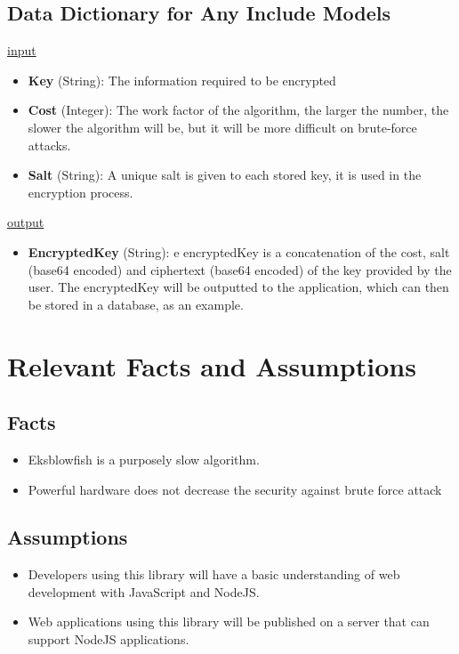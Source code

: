 \documentclass[12pt]{article}
\begin{document}
\subsection{Data Dictionary for Any Include Models}
	\underline{input} 
	\begin{itemize}
		\item \textbf{Key} (String): The information required to be encrypted
		\item \textbf{Cost} (Integer): The work factor of the algorithm, the larger the number, the slower the algorithm will be, but it will be more difficult on brute-force attacks.
		\item \textbf{Salt} (String): A unique salt is given to each stored key, it is used in the encryption process.
	\end{itemize}

	\underline{output}
	\begin{itemize}
		\item \textbf{EncryptedKey} (String): e encryptedKey is a concatenation of the cost, salt (base64 encoded) and ciphertext (base64 encoded) of the key provided by the user. The encryptedKey will be outputted to the application, which can then be stored in a database, as an example. 
	\end{itemize}

\section{Relevant Facts and Assumptions}
\subsection{Facts}
	\begin{itemize}
		\item Eksblowfish is a purposely slow algorithm.
		\item Powerful hardware does not decrease the security against brute force attack
	\end{itemize}

\subsection{Assumptions}
	\begin{itemize}
		\item Developers using this library will have a basic understanding of web development with JavaScript and NodeJS.
		\item Web applications using this library will be published on a server that can support NodeJS applications.

	\end{itemize} 
\end{document}
